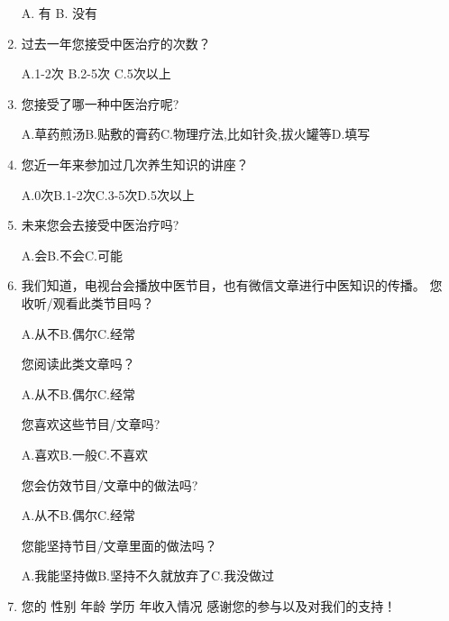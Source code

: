 \begin{enumerate}
A. 有\qquad
B. 没有

\item
过去一年您接受中医治疗的次数？

A.1-2次\qquad
B.2-5次\qquad
C.5次以上

\item
您接受了哪一种中医治疗呢?

A.草药煎汤\qquad B.贴敷的膏药\qquad C.物理疗法,比如针灸,拔火罐等\qquad D.填写\underline{\makebox[6em]{}}

\item 
您近一年来参加过几次养生知识的讲座？

A.0次\qquad B.1-2次\qquad C.3-5次\qquad D.5次以上

\item 
未来您会去接受中医治疗吗?

A.会\qquad B.不会\qquad C.可能

\item 
我们知道，电视台会播放中医节目，也有微信文章进行中医知识的传播。
\subitem 
   您收听/观看此类节目吗？
   
    A.从不\qquad B.偶尔\qquad C.经常

	\subitem 
    您阅读此类文章吗？
	
    A.从不\qquad B.偶尔\qquad C.经常
    
    \subitem 
    您喜欢这些节目/文章吗?
	
    A.喜欢\qquad B.一般\qquad C.不喜欢
    
    \subitem 
    您会仿效节目/文章中的做法吗?
	
	A.从不\qquad B.偶尔\qquad C.经常
    
    \subitem 
   您能坚持节目/文章里面的做法吗？
   
    A.我能坚持做\qquad B.坚持不久就放弃了\qquad C.我没做过
    
\item 
您的
性别\underline{\makebox[6em]{}}
年龄\underline{\makebox[6em]{}}
学历\underline{\makebox[6em]{}}
年收入情况\underline{\makebox[6em]{}}
\newline
感谢您的参与以及对我们的支持！
\end{enumerate}
